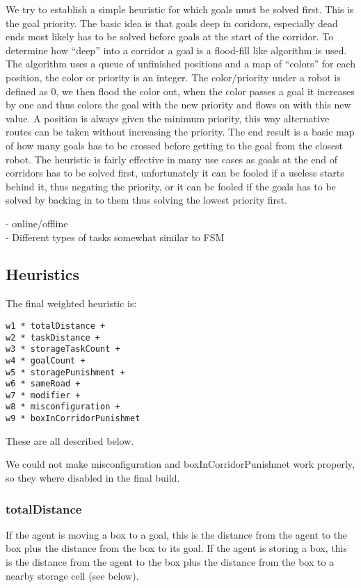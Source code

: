 \documentclass[letterpaper]{article}
\begin{document}
We try to establish a simple heuristic for which goals must be solved first.
This is the goal priority. The basic idea is that goals deep in coridors,
especially dead ends most likely has to be solved before goals at the start of
the corridor. To determine how ``deep'' into a corridor a goal is a flood-fill
like algorithm is used. The algorithm uses a queue of unfinished positions and a
map of ``colors'' for each position, the color or priority is an integer.
The color/priority under a robot is defined as 0, we then flood the color out,
when the color passes a goal it increases by one and thus colors the goal with
the new priority and flows on with this new value. A position is always given
the minimum priority, this way alternative routes can be taken without
increasing the priority. The end result is a basic map of how many goals has to
be crossed before getting to the goal from the closest robot.
The heuristic is fairly effective in many use cases as goals at the end of
corridors has to be solved first, unfortunately it can be fooled if a useless
starts behind it, thus negating the priority, or it can be fooled if the goals
has to be solved by backing in to them thus solving the lowest priority first.

- online/offline\\
- Different types of tasks somewhat similar to FSM\\

\subsection{Heuristics}
The final weighted heuristic is:
\begin{verbatim}
w1 * totalDistance +
w2 * taskDistance +
w3 * storageTaskCount +
w4 * goalCount +
w5 * storagePunishment +
w6 * sameRoad +
w7 * modifier +
w8 * misconfiguration +
w9 * boxInCorridorPunishmet
\end{verbatim}
These are all described below.

We could not make misconfiguration and boxInCorridorPunishmet
work properly, so they where disabled in the final build.

\subsubsection{totalDistance}
If the agent is moving a box to a goal, this is the distance from the agent
to the box plus the distance from the box to its goal. If the agent is storing
a box, this is the distance from the agent to the box plus the distance from the
box to a nearby storage cell (see below).
\end{document}
